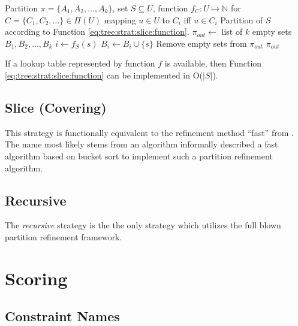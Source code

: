			\begin{algorithm}[ht!]
				\centering
				\begin{algorithmic}
					\Require Partition $\pi = \{ A_1, A_2, \ldots, A_k \}$, set $S \subseteq U$, function $f_C: U \mapsto \mathbb{N}$ for $C = \{ C_1, C_2, \ldots \} \in \Pi(U)$ mapping $u \in U$ to $C_i$ iff $u \in C_i$
					\Ensure Partition of $S$ according to Function \ref{eq:tree:strat:slice:function}.
					\Statex
						\State $\pi_{out} \gets$ list of $k$ empty sets $B_1, B_2, \ldots, B_k$
							\State $i \gets f_S(s)$
							\State $B_i \gets B_i \cup \{ s \}$
						\EndFor
						\State Remove empty sets from $\pi_{out}$
						\State \Return $\pi_{out}$
					\EndFunction
				\end{algorithmic}
				\caption{If a lookup table represented by function $f$ is available, then Function \ref{eq:tree:strat:slice:function} can be implemented in O($|S|$).}
				\label{algo:tree:strat:slice}
			\end{algorithm}
			
			\clearpage
		
		\subsection{Slice (Covering)}
		
			This strategy is functionally equivalent to the refinement method \enquote{fast} from \cite{salvagninDetectingSemanticGroups2016}.
			The name most likely stems from an algorithm informally described a fast algorithm based on bucket sort to implement such a partition refinement algorithm.
			
			\clearpage
		
		\subsection{Recursive}

			The \textit{recursive} strategy is the the only strategy which utilizes the full blown partition refinement framework.
			
			\clearpage
			
	
	\section{Scoring}
	
		\subsection{Constraint Names}
		
